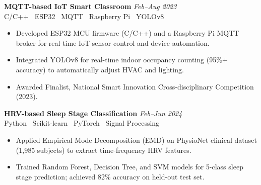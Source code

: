 \documentclass[10pt, a4paper]{article}
\begin{document}
\begin{minipage}[t]{0.6\textwidth}
\noindent\textbf{MQTT-based IoT Smart Classroom} \hfill \textit{Feb--Aug 2023}\\
{\small C/C++ \textbar\ ESP32 \textbar\ MQTT \textbar\ Raspberry Pi \textbar\ YOLOv8}
\begin{itemize}
  \item Developed ESP32 MCU firmware (C/C++) and a Raspberry Pi MQTT broker for real-time IoT sensor control and device automation.
  \item Integrated YOLOv8 for real-time indoor occupancy counting (95\%+ accuracy) to automatically adjust HVAC and lighting.
  \item Awarded Finalist, National Smart Innovation Cross-disciplinary Competition (2023).
\end{itemize}\vspace{5pt}

\noindent\textbf{HRV-based Sleep Stage Classification} \hfill \textit{Feb--Jun 2024}\\
{\small Python \textbar\ Scikit-learn \textbar\ PyTorch \textbar\ Signal Processing}
\begin{itemize}
  \item Applied Empirical Mode Decomposition (EMD) on PhysioNet clinical dataset (1,985 subjects) to extract time-frequency HRV features.
  \item Trained Random Forest, Decision Tree, and SVM models for 5-class sleep stage prediction; achieved 82\% accuracy on held-out test set.
\end{itemize}

\end{minipage}%
\hfill%
\end{document}
